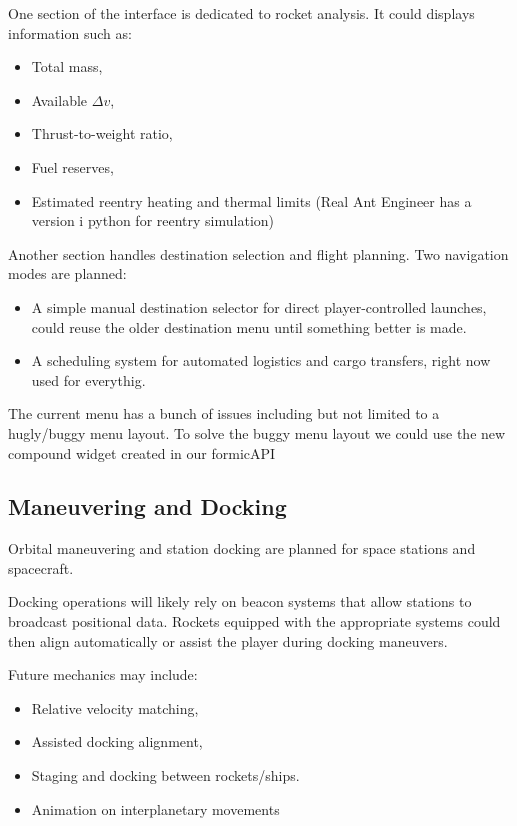 \documentclass{article}
\begin{document}
One section of the interface is dedicated to rocket analysis. It could displays information such as:

\begin{itemize}
    \item Total mass,
    \item Available $\Delta v$,
    \item Thrust-to-weight ratio,
    \item Fuel reserves,
    \item Estimated reentry heating and thermal limits (Real Ant Engineer has a version i python for reentry simulation)
\end{itemize}

Another section handles destination selection and flight planning. Two navigation modes are planned:

\begin{itemize}
    \item A simple manual destination selector for direct player-controlled launches, could reuse the older destination menu until something better is made.
    \item A scheduling system for automated logistics and cargo transfers, right now used for everythig.
\end{itemize}

The current menu has a bunch of issues including but not limited to a hugly/buggy menu layout. To solve the buggy menu layout we could use the new compound widget created in our formicAPI

\subsection{Maneuvering and Docking}

Orbital maneuvering and station docking are planned for space stations and spacecraft.

Docking operations will likely rely on beacon systems that allow stations to broadcast positional data. Rockets equipped with the appropriate systems could then align automatically or assist the player during docking maneuvers.

Future mechanics may include:

\begin{itemize}
    \item Relative velocity matching,
    \item Assisted docking alignment,
    \item Staging and docking between rockets/ships.
    \item Animation on interplanetary movements
\end{itemize}
\end{document}
